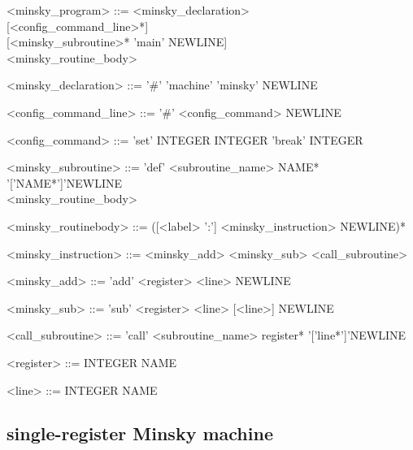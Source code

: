 \begin{definition}
\hfill
\begin{grammar}
<minsky\_program> ::= <minsky\_declaration>\\{}[<config\_command\_line>*]\\{}[<minsky\_subroutine>* 'main' NEWLINE]\\<minsky\_routine\_body>

<minsky\_declaration> ::= '\#' 'machine' 'minsky' NEWLINE

<config\_command\_line> ::= '\#' <config\_command> NEWLINE

<config\_command> ::= 'set' INTEGER INTEGER
                 \alt 'break' INTEGER

<minsky\_subroutine> ::= 'def' <subroutine\_name> NAME* '['NAME*']'NEWLINE\\<minsky\_routine\_body> 

<minsky\_routinebody> ::= ([<label> ':'] <minsky\_instruction> NEWLINE)*

<minsky\_instruction> ::= <minsky\_add>
                     \alt <minsky\_sub>
                     \alt <call\_subroutine>

<minsky\_add> ::= 'add' <register> <line> NEWLINE

<minsky\_sub> ::= 'sub' <register> <line> [<line>] NEWLINE

<call\_subroutine> ::= 'call' <subroutine\_name> register* '['line*']'NEWLINE

<register> ::= INTEGER
          \alt NAME

<line> ::= INTEGER
       \alt NAME
\end{grammar}
\end{definition}



\subsection{single-register Minsky machine}

